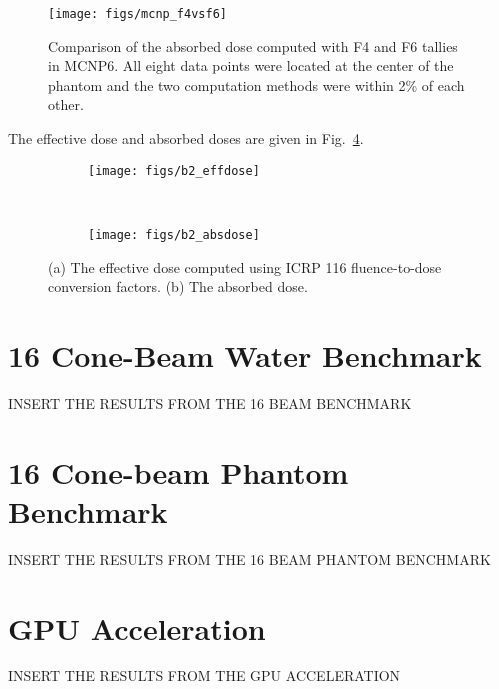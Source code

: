 \begin{figure}[tb]
  \begin{center}
   \texttt{[image: figs/mcnp\_f4vsf6]}
  \end{center}
  \caption{Comparison of the absorbed dose computed with F4 and F6 tallies in MCNP6. All eight data points were located at the center of the phantom and the two computation methods were within 2\% of each other.}
\label{fig:mcnp_f4vsf6}
\end{figure}

The effective dose and absorbed doses are given in Fig.~\ref{fig:b2_dose}.

\begin{figure}
    \centering
    \begin{subfigure}[b]{0.45\textwidth}
        \texttt{[image: figs/b2\_effdose]}
        \caption{}
        \label{fig:b2_effdose}
    \end{subfigure}
    ~
    \begin{subfigure}[b]{0.45\textwidth}
        \texttt{[image: figs/b2\_absdose]}
        \caption{}
        \label{fig:b2_absdose}
    \end{subfigure}
    \caption{(a) The effective dose computed using ICRP 116 fluence-to-dose conversion factors. (b) The absorbed dose.}\label{fig:b2_dose}
\end{figure}

\section{16 Cone-Beam Water Benchmark}

INSERT THE RESULTS FROM THE 16 BEAM BENCHMARK

\section{16 Cone-beam Phantom Benchmark}

INSERT THE RESULTS FROM THE 16 BEAM PHANTOM BENCHMARK

\section{GPU Acceleration}

INSERT THE RESULTS FROM THE GPU ACCELERATION


\endinput
